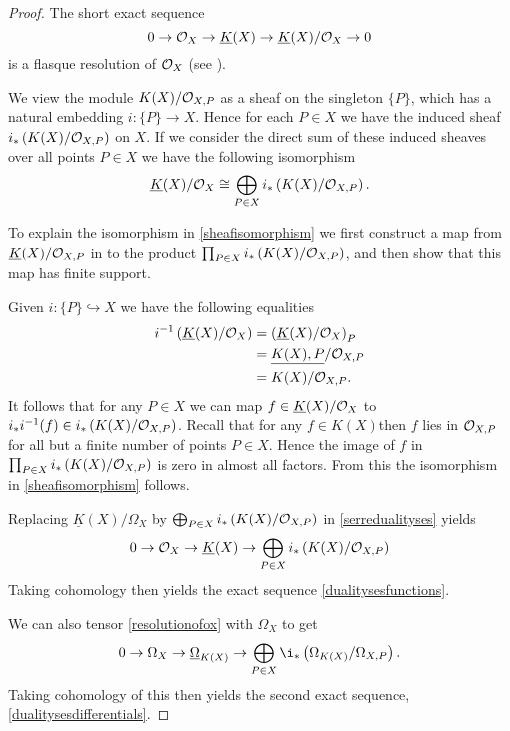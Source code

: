 \documentclass[11pt]{article} %
\theoremstyle{plain}
\theoremstyle{remark}
\newcommand{\cO}{{\cal O}}
\newcommand{\ra}{\rightarrow}
\begin{document}
\begin{proof}
The short exact sequence
\begin{equation}\label{serredualitysesfunctions}
0 \rightarrow \cO_X \rightarrow \underline{K}(X) \rightarrow \underline{K}(X)/\cO_X \rightarrow 0
\end{equation}
is a flasque resolution of $\cO_X$ (see \cite[Chap II, ex. 1.16]{hart}).

We view the module $K(X)/\cO_{X,P}$ as a sheaf on the singleton $\{P\}$, which has a natural embedding $i\colon \{P\} \rightarrow X$.
Hence for each $P\in X$ we have the induced sheaf $i_*\left( K(X)/\cO_{X,P} \right)$ on $X$.
If we consider the direct sum of these induced sheaves over all points $P\in X$ we have the following isomorphism
\begin{equation}\label{sheafisomorphism}
\underline{K}(X)/\cO_X\cong \bigoplus_{P\in X} i_*\left(K(X)/\cO_{X,P}\right).
\end{equation}


To explain the isomorphism in \eqref{sheafisomorphism} we first construct a map from $\underline{K}(X)/\cO_{X,P}$ in to the product $\prod_{P \in X} i_*\left({K(X)}/\cO_{X,P}\right)$, and then show that this map has finite support.

Given $i\colon \{P\} \hookrightarrow X$ we have the following equalities
\begin{align*}
i^{-1}\left(\underline{K}(X)/\cO_X\right) & = \left(\underline{K}(X)/\cO_X\right)_P \\
& = \underline{K(X),P}/\cO_{X,P} \\
& = K(X)/\cO_{X,P}.
\end{align*}
It follows that for any $P \in X$ we can map $f \in \underline{K}(X)/\cO_X$ to $i_*i^{-1}(f) \in i_* \left( K(X)/\cO_{X,P} \right)$.
Recall that for any $f \in K(X)$then $f$ lies in $\cO_{X,P}$ for all but a finite number of points $P \in X$.
Hence the image of $f$ in $\prod_{P \in X} i_*\left(K(X)/\cO_{X,P}\right)$ is zero in almost all factors.
From this the isomorphism in \eqref{sheafisomorphism} follows.

Replacing $\underline{K}(X)/\Omega_X$ by $\bigoplus_{P\in X} i_*\left(K(X)/\cO_{X,P}\right)$ in \eqref{serredualityses} yields
\begin{equation}\label{resolutionofox}
0 \ra \cO_X \ra \underline{K}(X) \ra \bigoplus_{P \in X}i_* \left( K(X)/\cO_{X,P} \right)
\end{equation}
Taking cohomology then yields the exact sequence \eqref{dualitysesfunctions}.

We can also tensor \eqref{resolutionofox} with $\Omega_X$ to get
\[
0 \ra \Omega_X \ra \underline{\Omega}_{K(X)} \ra \bigoplus_{P \in X} \i_* \left( \Omega_{K(X)}/\Omega_{X,P} \right).
\]
Taking cohomology of this then yields the second exact sequence, \eqref{dualitysesdifferentials}.
\end{proof}
\end{document}
